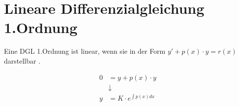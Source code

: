 \section{Lineare Differenzialgleichung 1.Ordnung}
Eine DGL 1.Ordnung ist linear, wenn sie in der Form $y'+p(x)\cdot y = r(x)$ darstellbar . 

\begin{center}
\begin{align*}
0 &= y + p(x)\cdot y \\
&\downarrow \\
y &= K\cdot e^{\int p(x)dx}
\end{align*}
\end{center}